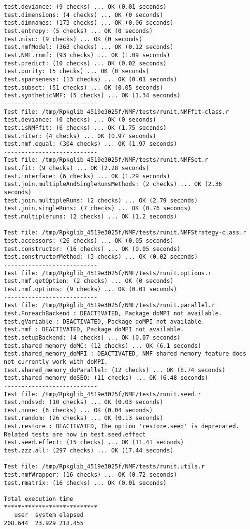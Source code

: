 \documentclass[10pt]{article}
\begin{document}
\begin{verbatim}
test.deviance: (9 checks) ... OK (0.01 seconds)
test.dimensions: (4 checks) ... OK (0 seconds)
test.dimnames: (173 checks) ... OK (0.06 seconds)
test.entropy: (5 checks) ... OK (0 seconds)
test.misc: (9 checks) ... OK (0 seconds)
test.nmfModel: (363 checks) ... OK (0.12 seconds)
test.NMF.rnmf: (93 checks) ... OK (1.09 seconds)
test.predict: (10 checks) ... OK (0.02 seconds)
test.purity: (5 checks) ... OK (0 seconds)
test.sparseness: (13 checks) ... OK (0.01 seconds)
test.subset: (51 checks) ... OK (0.05 seconds)
test.syntheticNMF: (5 checks) ... OK (1.34 seconds)
--------------------------- 
Test file: /tmp/Rpkglib_4519e3025f/NMF/tests/runit.NMFfit-class.r 
test.deviance: (0 checks) ... OK (0 seconds)
test.isNMFfit: (6 checks) ... OK (1.75 seconds)
test.niter: (4 checks) ... OK (0.97 seconds)
test.nmf.equal: (304 checks) ... OK (1.97 seconds)
--------------------------- 
Test file: /tmp/Rpkglib_4519e3025f/NMF/tests/runit.NMFSet.r 
test.fit: (9 checks) ... OK (2.28 seconds)
test.interface: (6 checks) ... OK (1.29 seconds)
test.join.multipleAndSingleRunsMethods: (2 checks) ... OK (2.36 seconds)
test.join.multipleRuns: (2 checks) ... OK (2.79 seconds)
test.join.singleRuns: (7 checks) ... OK (0.76 seconds)
test.multipleruns: (2 checks) ... OK (1.2 seconds)
--------------------------- 
Test file: /tmp/Rpkglib_4519e3025f/NMF/tests/runit.NMFStrategy-class.r 
test.accessors: (26 checks) ... OK (0.05 seconds)
test.constructor: (16 checks) ... OK (0.05 seconds)
test.constructorMethod: (3 checks) ... OK (0.02 seconds)
--------------------------- 
Test file: /tmp/Rpkglib_4519e3025f/NMF/tests/runit.options.r 
test.nmf.getOption: (2 checks) ... OK (0 seconds)
test.nmf.options: (9 checks) ... OK (0.01 seconds)
--------------------------- 
Test file: /tmp/Rpkglib_4519e3025f/NMF/tests/runit.parallel.r 
test.ForeachBackend : DEACTIVATED, Package doMPI not available.
test.gVariable : DEACTIVATED, Package doMPI not available.
test.nmf : DEACTIVATED, Package doMPI not available.
test.setupBackend: (4 checks) ... OK (0.07 seconds)
test.shared_memory_doMC: (12 checks) ... OK (6.1 seconds)
test.shared_memory_doMPI : DEACTIVATED, NMF shared memory feature does not currently work with doMPI.
test.shared_memory_doParallel: (12 checks) ... OK (8.74 seconds)
test.shared_memory_doSEQ: (11 checks) ... OK (6.48 seconds)
--------------------------- 
Test file: /tmp/Rpkglib_4519e3025f/NMF/tests/runit.seed.r 
test.nndsvd: (10 checks) ... OK (0.03 seconds)
test.none: (6 checks) ... OK (0.04 seconds)
test.random: (26 checks) ... OK (0.13 seconds)
test.restore : DEACTIVATED, The option 'restore.seed' is deprecated. Related tests are now in test.seed.effect
test.seed.effect: (15 checks) ... OK (11.41 seconds)
test.zzz.all: (297 checks) ... OK (17.44 seconds)
--------------------------- 
Test file: /tmp/Rpkglib_4519e3025f/NMF/tests/runit.utils.r 
test.nmfWrapper: (16 checks) ... OK (0.72 seconds)
test.rmatrix: (16 checks) ... OK (0.01 seconds)

Total execution time
***************************
   user  system elapsed 
208.644  23.929 218.455 

\end{verbatim}
\end{document}
